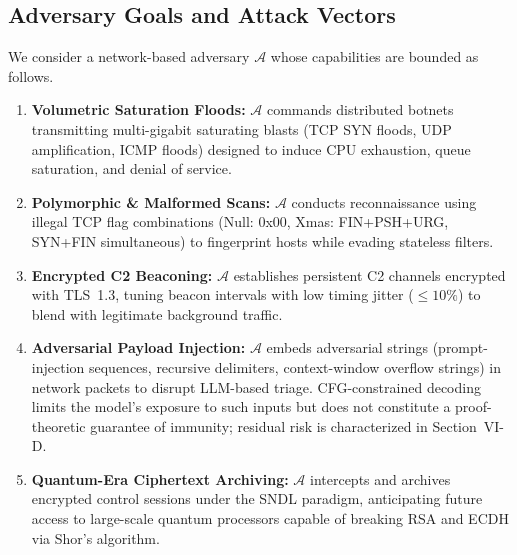 \documentclass[journal]{IEEEtran}
\renewcommand{\_}{\textunderscore\allowbreak}
\begin{document}
\subsection{Adversary Goals and Attack Vectors}
We consider a network-based adversary $\mathcal{A}$ whose capabilities are
bounded as follows.
\begin{enumerate}
  \item \textbf{Volumetric Saturation Floods:} $\mathcal{A}$ commands distributed
    botnets transmitting multi-gigabit saturating blasts (TCP SYN floods, UDP
    amplification, ICMP floods) designed to induce CPU exhaustion, queue
    saturation, and denial of service.

  \item \textbf{Polymorphic \& Malformed Scans:} $\mathcal{A}$ conducts
    reconnaissance using illegal TCP flag combinations (Null: 0x00, Xmas:
    FIN+PSH+URG, SYN+FIN simultaneous) to fingerprint hosts while evading
    stateless filters.

  \item \textbf{Encrypted C2 Beaconing:} $\mathcal{A}$ establishes persistent C2
    channels encrypted with TLS~1.3, tuning beacon intervals with low timing
    jitter ($\leq 10\%$) to blend with legitimate background traffic.

  \item \textbf{Adversarial Payload Injection:} $\mathcal{A}$ embeds adversarial
    strings (prompt-injection sequences, recursive delimiters, context-window
    overflow strings) in network packets to disrupt LLM-based triage.
    CFG-constrained decoding limits the model's exposure to such inputs but does
    not constitute a proof-theoretic guarantee of immunity; residual risk is
    characterized in Section~VI-D.

  \item \textbf{Quantum-Era Ciphertext Archiving:} $\mathcal{A}$ intercepts and
    archives encrypted control sessions under the SNDL paradigm, anticipating
    future access to large-scale quantum processors capable of breaking RSA and
    ECDH via Shor's algorithm.
\end{enumerate}
\end{document}

